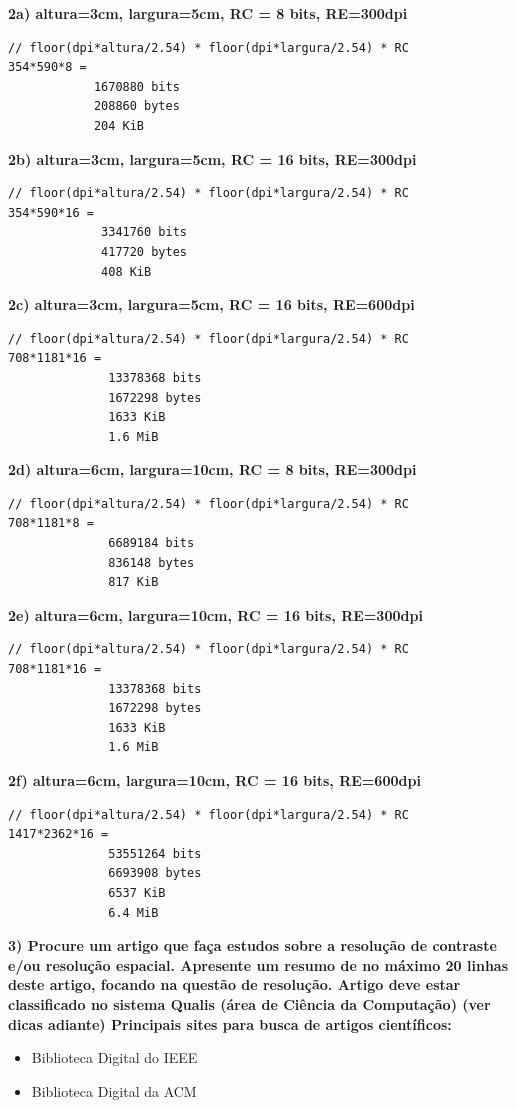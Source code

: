\documentclass[a4paper]{sbgames}               %
\begin{document}
\textbf{2a) altura=3cm, largura=5cm, RC = 8 bits, RE=300dpi
}\begin{lstlisting}
// floor(dpi*altura/2.54) * floor(dpi*largura/2.54) * RC
354*590*8 =
            1670880 bits
            208860 bytes
            204 KiB
\end{lstlisting}

\textbf{2b) altura=3cm, largura=5cm, RC = 16 bits, RE=300dpi}
\begin{lstlisting}
// floor(dpi*altura/2.54) * floor(dpi*largura/2.54) * RC
354*590*16 =
             3341760 bits
             417720 bytes
             408 KiB
\end{lstlisting}
\pagebreak
\textbf{2c) altura=3cm, largura=5cm, RC = 16 bits, RE=600dpi}
\begin{lstlisting}
// floor(dpi*altura/2.54) * floor(dpi*largura/2.54) * RC
708*1181*16 =
              13378368 bits
              1672298 bytes
              1633 KiB
              1.6 MiB
\end{lstlisting}

\textbf{2d) altura=6cm, largura=10cm, RC = 8 bits, RE=300dpi}
\begin{lstlisting}
// floor(dpi*altura/2.54) * floor(dpi*largura/2.54) * RC
708*1181*8 =
              6689184 bits
              836148 bytes
              817 KiB
\end{lstlisting}

\textbf{2e) altura=6cm, largura=10cm, RC = 16 bits, RE=300dpi}
\begin{lstlisting}
// floor(dpi*altura/2.54) * floor(dpi*largura/2.54) * RC
708*1181*16 =
              13378368 bits
              1672298 bytes
              1633 KiB
              1.6 MiB
\end{lstlisting}

\textbf{2f) altura=6cm, largura=10cm, RC = 16 bits, RE=600dpi}
\begin{lstlisting}
// floor(dpi*altura/2.54) * floor(dpi*largura/2.54) * RC
1417*2362*16 =
              53551264 bits
              6693908 bytes
              6537 KiB
              6.4 MiB
\end{lstlisting}

\textbf{3) Procure um artigo que faça estudos sobre a resolução de contraste e/ou resolução espacial. Apresente um resumo de no máximo 20 linhas deste artigo, focando na questão de resolução. Artigo deve estar classificado no sistema Qualis (área de Ciência da Computação) (ver dicas adiante) Principais sites para busca de artigos científicos:}
\begin{itemize}
\item Biblioteca Digital do IEEE
\item Biblioteca Digital da ACM
\end{itemize}
\end{document}
